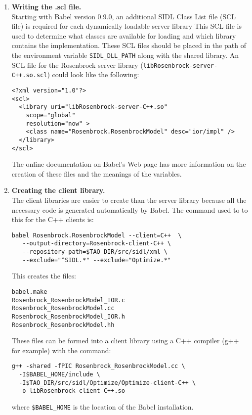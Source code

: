 \documentclass[doublespacing,12pt]{article}
\begin{document}
\begin{enumerate}
\item \textbf{Writing the .scl file.}\\
Starting with Babel version 0.9.0, an additional SIDL Class List file (SCL
file) is required for each dynamically loadable server library 
This SCL file is used to determine what classes are available for
loading and which library contains the implementation.  These SCL
files should be placed in the path of the environment variable 
\texttt{SIDL\_DLL\_PATH} along with the shared library.
An SCL file for the Rosen\-brock server library
(\texttt{libRosen\-brock-server-C++.so.scl})
could look like the following:
\begin{verbatim}
<?xml version="1.0"?> 
<scl>
  <library uri="libRosenbrock-server-C++.so" 
	scope="global" 
	resolution="now" > 
    <class name="Rosenbrock.RosenbrockModel" desc="ior/impl" />
  </library>
</scl>
\end{verbatim}
The online documentation on Babel's Web page \cite{babel} has more 
information on the creation of these files and the meanings of the variables.




\item \textbf{Creating the client library.} \\
The client libraries are easier to create than the server library because
all the necessary code is generated automatically by Babel.  The command used
to to this for the C++ clients is:
\begin{verbatim}
babel Rosenbrock.RosenbrockModel --client=C++  \
   --output-directory=Rosenbrock-client-C++ \
   --repository-path=$TAO_DIR/src/sidl/xml \
   --exclude="^SIDL.*" --exclude="Optimize.*"
\end{verbatim} %

This creates the files:\\
\begin{verbatim}
babel.make
Rosenbrock_RosenbrockModel_IOR.c
Rosenbrock_RosenbrockModel.cc
Rosenbrock_RosenbrockModel_IOR.h
Rosenbrock_RosenbrockModel.hh
\end{verbatim}

These files can be formed into a client library using a C++ compiler (g++ for
example) with the command:
\begin{verbatim}
g++ -shared -fPIC Rosenbrock_RosenbrockModel.cc \
  -I$BABEL_HOME/include \
  -I$TAO_DIR/src/sidl/Optimize/Optimize-client-C++ \
  -o libRosenbrock-client-C++.so 
\end{verbatim}
where \texttt{\$BABEL\_HOME} is the location of the Babel installation.


\end{enumerate}
\end{document}
